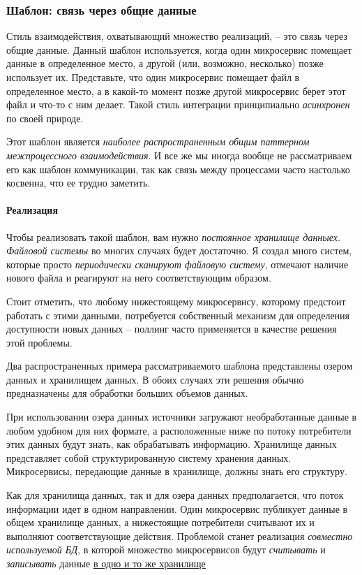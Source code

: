 \documentclass[%
	11pt,
	a4paper,
	utf8,
		]{article}
\begin{document}
\subsubsection{Шаблон: связь через общие данные}

Стиль взаимодействия, охватывающий множество реализаций, -- это связь через общие данные. Данный шаблон используется, когда один микросервис помещает данные в определенное место, а другой (или, возможно, несколько) позже использует их. Представьте, что один микросервис помещает файл в определенное место, а в какой-то момент позже другой микросервис берет этот файл и что-то с ним делает. Такой стиль интеграции принципиально \emph{асинхронен} по своей природе. 

Этот шаблон является \emph{наиболее распространенным общим паттерном межпроцессного взаимодействия}. И все же мы иногда вообще не рассматриваем его как шаблон коммуникации, так как связь между процессами часто настолько косвенна, что ее трудно заметить.

\paragraph{Реализация}

Чтобы реализовать такой шаблон, вам нужно \emph{постоянное хранилище данныех}. \emph{Файловой системы} во многих случаях будет достаточно. Я создал много систем, которые просто \emph{периодически сканируют файловую систему}, отмечают наличие нового файла и реагируют на него соответствующим образом.

Стоит отметить, что любому нижестоящему микросервису, которому предстоит работать с этими данными, потребуется собственный механизм для определения доступности новых данных -- поллинг часто применяется в качестве решения этой проблемы.

Два распространенных примера рассматриваемого шаблона представлены озером данных и хранилищем данных. В обоих случаях эти решения обычно предназначены для обработки больших объемов данных.

При использовании озера данных источники загружают необработанные данные в любом удобном для них формате, а расположенные ниже по потоку потребители этих данных будут знать, как обрабатывать информацию. Хранилище данных представляет собой структурированную систему хранения данных. Микросервисы, передающие данные в хранилище, должны знать его структуру.

Как для хранилища данных, так и для озера данных предполагается, что поток информации идет в одном направлении. Один микросервис публикует данные в общем хранилище данных, а нижестоящие потребители считывают их и выполняют соответствующие действия. {\color{red}Проблемой станет реализация \emph{совместно используемой БД}, в которой множество микросервисов будут \emph{считывать} и \emph{записывать} данные \underline{в одно и то же хранилище}} \cite[]{microservices-2024}
\end{document}
